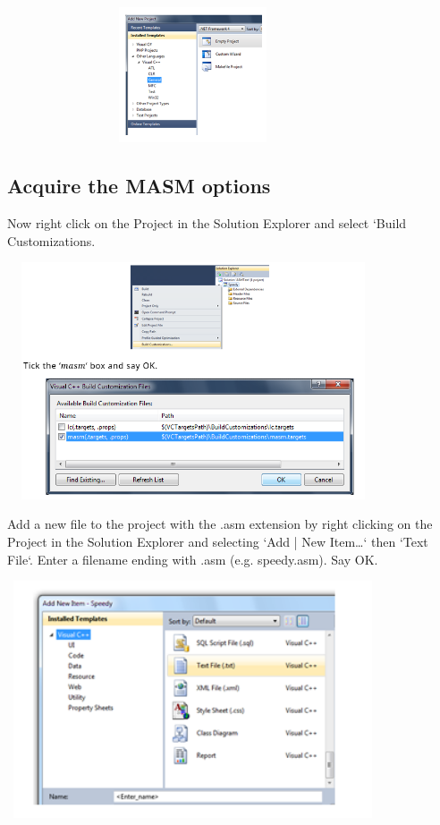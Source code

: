 \documentclass[12pt]{extarticle}
\begin{document}
\begin{center}

    \includegraphics[width=11cm, height=4cm]{tt1}
    
 \end{center}

 \subsection{Acquire the MASM options}

 Now right click on the Project in the Solution Explorer and select ‘Build Customizations.
 \begin{center}

    \includegraphics[width=11cm, height=7cm]{tt2}
    
 \end{center}

 Add a new file to the project with the .asm extension by right clicking on the Project in the Solution Explorer and selecting ‘Add | New Item…‘ then ‘Text File‘. Enter a filename ending with .asm (e.g. speedy.asm). Say OK.

 \begin{center}

    \includegraphics[width=11cm, height=7cm]{tty}
    
 \end{center}
\end{document}
